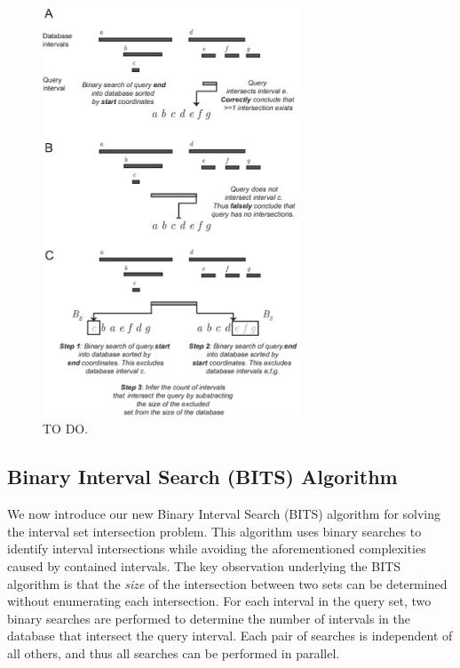 \documentclass{bioinfo}
\begin{document}
        \begin{figure}[h]
                \centering
                \includegraphics[width=3in]{figures/Figure1.v3.eps}
                \caption{TO DO.}
                \label{bitssearching}
        \end{figure}
        
        
        \subsection{Binary Interval Search (BITS) Algorithm}
        We now introduce our new Binary Interval Search (BITS) algorithm for solving
        the interval set intersection problem.  This algorithm uses binary searches
        to identify interval intersections while avoiding the aforementioned
        complexities caused by contained intervals. The key observation underlying the BITS 
        algorithm is that the \emph{size} of the intersection between two sets can be 
        determined without enumerating each intersection.  For each interval 
        in the query set, two binary searches are performed to determine the number
        of intervals in the database that intersect the query interval.  Each pair of
        searches is independent of all others, and thus all searches can be
        performed in parallel.  
        
\end{document}
